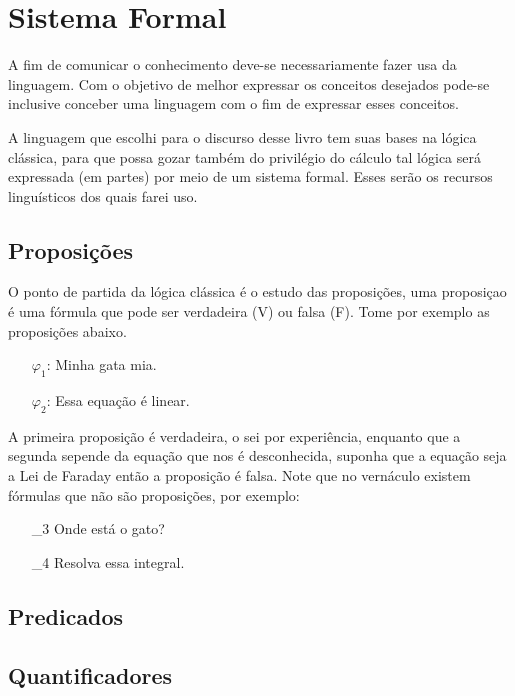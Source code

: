 \chapter{Sistema Formal}

A fim de comunicar o conhecimento deve-se necessariamente
fazer usa da linguagem.
Com o objetivo de melhor expressar os conceitos desejados
pode-se inclusive conceber uma linguagem com o fim de
expressar esses conceitos.

A linguagem que escolhi para o discurso desse livro tem suas bases
na lógica clássica,
para que possa gozar também do privilégio do cálculo
tal lógica será expressada (em partes) por meio de um sistema formal.
Esses serão os recursos linguísticos dos quais farei uso.

\section{Proposições}

O ponto de partida da lógica clássica é o estudo das proposições,
uma proposiçao é uma fórmula que pode ser verdadeira (V) ou falsa (F).
Tome por exemplo as proposições abaixo.

\begin{itemize}
   \item[$\varphi_1$:] Minha gata mia.
   \item[$\varphi_2$:] Essa equação é linear.
\end{itemize}

\noindent
A primeira proposição é verdadeira, o sei por experiência,
enquanto que a segunda sepende da equação que nos é desconhecida,
suponha que a equação seja a Lei de Faraday então a proposição é falsa.
Note que no vernáculo existem fórmulas que não são proposições,
por exemplo:

\begin{itemize}
   \item[\varphi_3] Onde está o gato?
   \item[\varphi_4] Resolva essa integral.
\end{itemize}

\section{Predicados}

\section{Quantificadores}

